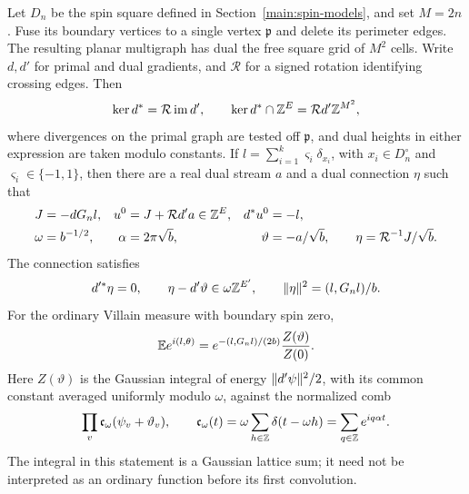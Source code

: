\begin{lemma}\label{vi:duality}
Let $D_n$ be the spin square defined in Section~\ref{main:spin-models}, and set
$M=2n$.  Fuse its boundary vertices to a single vertex $\mathfrak p$ and
delete its perimeter edges.  The resulting planar multigraph has dual the
free square grid of $M^2$ cells.  Write $d,d'$ for primal and dual gradients,
and $\mathcal R$ for a signed rotation identifying crossing edges.  Then
\begin{equation}
 \ker d^*=\mathcal R\operatorname{im}d',\qquad
 \ker d^*\cap\mathbb Z^{E}=\mathcal R d'\mathbb Z^{M^2},
 \label{vi:hodge}
\end{equation}
where divergences on the primal graph are tested off $\mathfrak p$, and
dual heights in either expression are taken modulo constants.
If $l=\sum_{i=1}^k\varsigma_i\delta_{x_i}$, with
$x_i\in D_n^\circ$ and $\varsigma_i\in\{-1,1\}$, then there are a real
dual stream $a$ and a dual connection $\eta$ such that
\begin{align}
 J&=-dG_nl,& u^0&=J+\mathcal R d'a\in\mathbb Z^E,&
 d^*u^0&=-l,\label{vi:current}\\
 \omega&=b^{-1/2},&\alpha&=2\pi\sqrt b,&
 \vartheta&=-a/\sqrt b,\qquad \eta=\mathcal R^{-1}J/\sqrt b.
 \label{vi:twist}
\end{align}
The connection satisfies
\begin{equation}
 d'^*\eta=0,\qquad
 \eta-d'\vartheta\in\omega\mathbb Z^{E'},\qquad
 \lVert \eta\rVert^2=(l,G_nl)/b.\label{vi:connection}
\end{equation}
For the ordinary Villain measure with boundary spin zero,
\begin{equation}
 \mathbb E e^{i(l,\theta)}
 =e^{-(l,G_nl)/(2b)}\frac{Z(\vartheta)}{Z(0)}.
 \label{vi:exact-duality}
\end{equation}
Here $Z(\vartheta)$ is the Gaussian integral of energy
$\lVert d'\psi\rVert^2/2$, with its common constant averaged uniformly modulo
$\omega$, against the normalized comb
\begin{equation}
 \prod_v\mathfrak c_\omega(\psi_v+\vartheta_v),\qquad
 \mathfrak c_\omega(t)=\omega\sum_{h\in\mathbb Z}\delta(t-\omega h)
                 =\sum_{q\in\mathbb Z}e^{iq\alpha t}.
 \label{vi:comb}
\end{equation}
The integral in this statement is a Gaussian lattice sum; it need not be
interpreted as an ordinary function before its first convolution.
\end{lemma}

